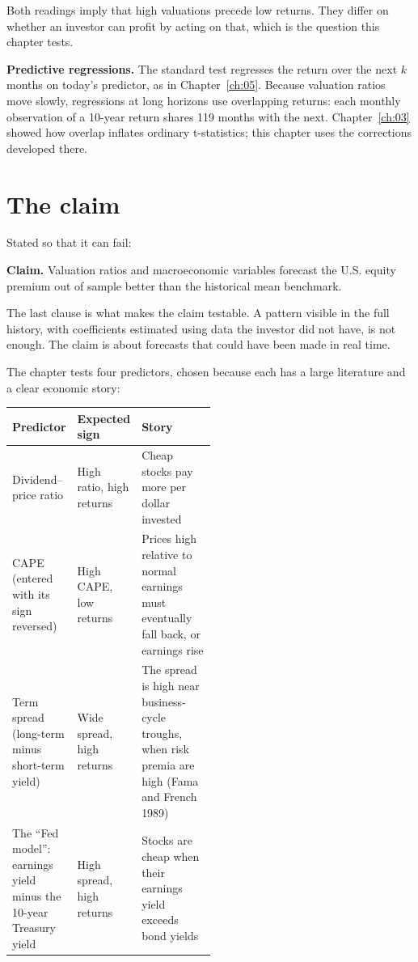 Both readings imply that high valuations precede low returns. They differ on whether an investor can profit by acting on that, which is the question this chapter tests.

\textbf{Predictive regressions.} The standard test regresses the return over the next $k$ months on today's predictor, as in Chapter~\ref{ch:05}. Because valuation ratios move slowly, regressions at long horizons use overlapping returns: each monthly observation of a 10-year return shares 119 months with the next. Chapter~\ref{ch:03} showed how overlap inflates ordinary t-statistics; this chapter uses the corrections developed there.

\section{The claim}
\label{sec:07-claim}

Stated so that it can fail:

\begin{callout}
\textbf{Claim.} Valuation ratios and macroeconomic variables forecast the U.S. equity premium out of sample better than the historical mean benchmark.
\end{callout}

The last clause is what makes the claim testable. A pattern visible in the full history, with coefficients estimated using data the investor did not have, is not enough. The claim is about forecasts that could have been made in real time.

The chapter tests four predictors, chosen because each has a large literature and a clear economic story:

\begin{center}
\small
\begin{tabularx}{0.9\linewidth}{@{}>{\raggedright\arraybackslash}p{0.30\linewidth}>{\raggedright\arraybackslash}p{0.20\linewidth}>{\raggedright\arraybackslash}X@{}}
\toprule
Predictor & Expected sign & Story \\
\midrule
Dividend--price ratio & High ratio, high returns & Cheap stocks pay more per dollar invested \\
CAPE (entered with its sign reversed) & High CAPE, low returns & Prices high relative to normal earnings must eventually fall back, or earnings rise \\
Term spread (long-term minus short-term yield) & Wide spread, high returns & The spread is high near business-cycle troughs, when risk premia are high (Fama and French 1989) \\
The ``Fed model'': earnings yield minus the 10-year Treasury yield & High spread, high returns & Stocks are cheap when their earnings yield exceeds bond yields \\
\bottomrule
\end{tabularx}
\end{center}

